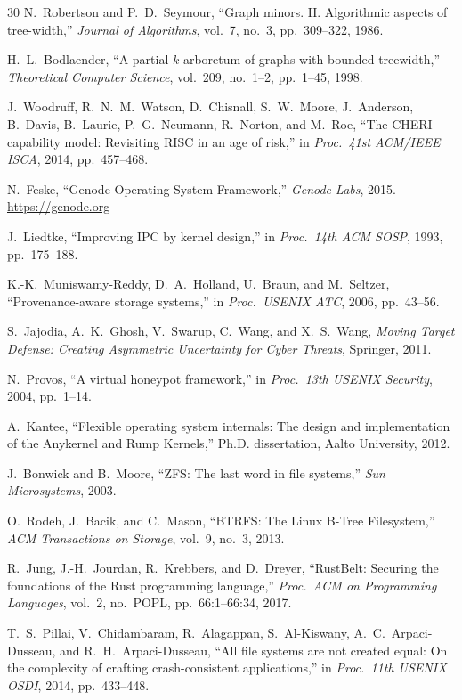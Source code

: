 \documentclass[11pt,a4paper]{article}
\theoremstyle{definition}
\theoremstyle{remark}
\begin{document}
\begin{thebibliography}{30}
N.~Robertson and P.~D.~Seymour,
``Graph minors. II. Algorithmic aspects of tree-width,''
\emph{Journal of Algorithms}, vol.~7, no.~3, pp.~309--322, 1986.

H.~L.~Bodlaender,
``A partial $k$-arboretum of graphs with bounded treewidth,''
\emph{Theoretical Computer Science}, vol.~209, no.~1--2,
pp.~1--45, 1998.

J.~Woodruff, R.~N.~M.~Watson, D.~Chisnall, S.~W.~Moore,
J.~Anderson, B.~Davis, B.~Laurie, P.~G.~Neumann, R.~Norton,
and M.~Roe,
``The CHERI capability model: Revisiting RISC in an age of risk,''
in \emph{Proc.\ 41st ACM/IEEE ISCA}, 2014, pp.~457--468.

N.~Feske,
``Genode Operating System Framework,''
\emph{Genode Labs}, 2015.
\url{https://genode.org}

J.~Liedtke,
``Improving IPC by kernel design,''
in \emph{Proc.\ 14th ACM SOSP}, 1993, pp.~175--188.

K.-K.~Muniswamy-Reddy, D.~A.~Holland, U.~Braun, and M.~Seltzer,
``Provenance-aware storage systems,''
in \emph{Proc.\ USENIX ATC}, 2006, pp.~43--56.

S.~Jajodia, A.~K.~Ghosh, V.~Swarup, C.~Wang, and X.~S.~Wang,
\emph{Moving Target Defense: Creating Asymmetric Uncertainty for
Cyber Threats},
Springer, 2011.

N.~Provos,
``A virtual honeypot framework,''
in \emph{Proc.\ 13th USENIX Security}, 2004, pp.~1--14.

A.~Kantee,
``Flexible operating system internals: The design and implementation
of the Anykernel and Rump Kernels,''
Ph.D. dissertation, Aalto University, 2012.

J.~Bonwick and B.~Moore,
``ZFS: The last word in file systems,''
\emph{Sun Microsystems}, 2003.

O.~Rodeh, J.~Bacik, and C.~Mason,
``BTRFS: The Linux B-Tree Filesystem,''
\emph{ACM Transactions on Storage}, vol.~9, no.~3, 2013.

R.~Jung, J.-H.~Jourdan, R.~Krebbers, and D.~Dreyer,
``RustBelt: Securing the foundations of the Rust programming
language,''
\emph{Proc.\ ACM on Programming Languages}, vol.~2, no.~POPL,
pp.~66:1--66:34, 2017.

T.~S.~Pillai, V.~Chidambaram, R.~Alagappan, S.~Al-Kiswany,
A.~C.~Arpaci-Dusseau, and R.~H.~Arpaci-Dusseau,
``All file systems are not created equal: On the complexity of
crafting crash-consistent applications,''
in \emph{Proc.\ 11th USENIX OSDI}, 2014, pp.~433--448.


\end{thebibliography}
\end{document}
